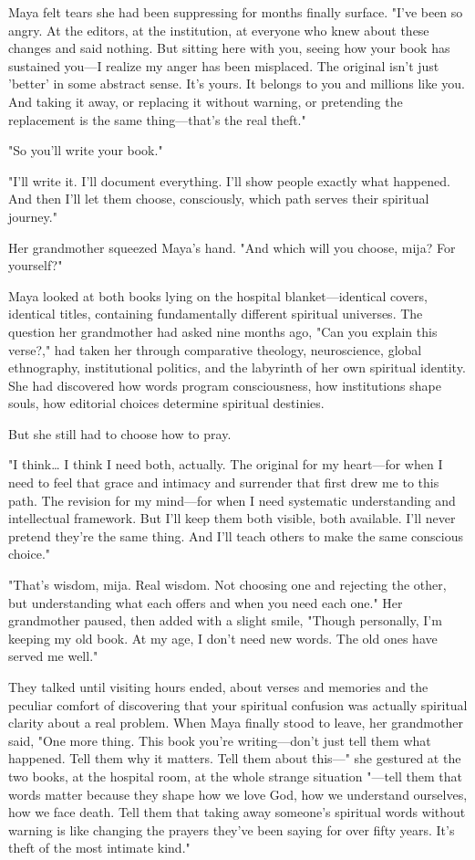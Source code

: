 \documentclass[12pt,twoside]{book}
\begin{document}
Maya felt tears she had been suppressing for months finally surface. "I've been so angry. At the editors, at the institution, at everyone who knew about these changes and said nothing. But sitting here with you, seeing how your book has sustained you—I realize my anger has been misplaced. The original isn't just 'better' in some abstract sense. It's yours. It belongs to you and millions like you. And taking it away, or replacing it without warning, or pretending the replacement is the same thing—that's the real theft."

"So you'll write your book."

"I'll write it. I'll document everything. I'll show people exactly what happened. And then I'll let them choose, consciously, which path serves their spiritual journey."

Her grandmother squeezed Maya's hand. "And which will you choose, mija? For yourself?"

Maya looked at both books lying on the hospital blanket—identical covers, identical titles, containing fundamentally different spiritual universes. The question her grandmother had asked nine months ago, "Can you explain this verse?," had taken her through comparative theology, neuroscience, global ethnography, institutional politics, and the labyrinth of her own spiritual identity. She had discovered how words program consciousness, how institutions shape souls, how editorial choices determine spiritual destinies.

But she still had to choose how to pray.

"I think\ldots{} I think I need both, actually. The original for my heart—for when I need to feel that grace and intimacy and surrender that first drew me to this path. The revision for my mind—for when I need systematic understanding and intellectual framework. But I'll keep them both visible, both available. I'll never pretend they're the same thing. And I'll teach others to make the same conscious choice."

"That's wisdom, mija. Real wisdom. Not choosing one and rejecting the other, but understanding what each offers and when you need each one." Her grandmother paused, then added with a slight smile, "Though personally, I'm keeping my old book. At my age, I don't need new words. The old ones have served me well."

They talked until visiting hours ended, about verses and memories and the peculiar comfort of discovering that your spiritual confusion was actually spiritual clarity about a real problem. When Maya finally stood to leave, her grandmother said, "One more thing. This book you're writing—don't just tell them what happened. Tell them why it matters. Tell them about this—" she gestured at the two books, at the hospital room, at the whole strange situation "—tell them that words matter because they shape how we love God, how we understand ourselves, how we face death. Tell them that taking away someone's spiritual words without warning is like changing the prayers they've been saying for over fifty years. It's theft of the most intimate kind."
\end{document}

